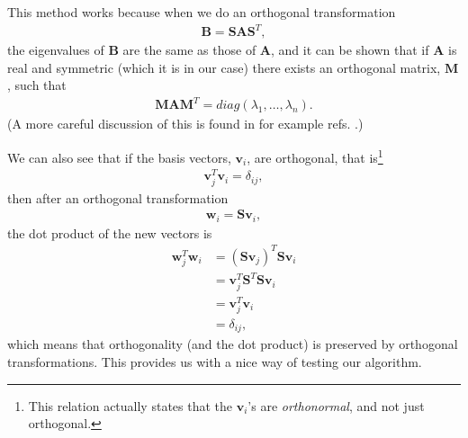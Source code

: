 \documentclass[12pt, a4paper]{article}
\begin{document}
This method works because when we do an orthogonal transformation 
\begin{align*}
\mathbf{B} = \mathbf{SAS}^T, 
\end{align*}
the eigenvalues of $\mathbf{B}$ are the same as those of $\mathbf{A}$, and
 it can be shown that \cite{Matrix Comp} if $\mathbf{A}$ is real and symmetric
(which it is in our case) there exists an orthogonal matrix, $\mathbf{M}$, such that 
\begin{align*}
\mathbf{MAM}^T = diag(\lambda_1,\dots,\lambda_n).  
\end{align*} 
(A more careful discussion of this is found in for example refs. \cite{Matrix Comp, Lecture Notes}.) 

We can also see that if the basis vectors, $\mathbf{v}_i$, are orthogonal, that is\footnote{This relation 
actually states that the $\mathbf{v}_i$'s are \textit{orthonormal}, and not just orthogonal.} 
\begin{align*}
\mathbf{v}_j^T\mathbf{v}_i = \delta_{ij}, 
\end{align*}
then after an orthogonal transformation 
\begin{align*}
\mathbf{w}_i = \mathbf{Sv}_i,  
\end{align*} 
the dot product of the new vectors is 
\begin{align*}
\mathbf{w}_j^T\mathbf{w}_i & = (\mathbf{Sv}_j)^T \mathbf{Sv}_i \\
						   & = \mathbf{v}_j^T\mathbf{S}^T \mathbf{Sv}_i \\ 
						   & = \mathbf{v}_j^T\mathbf{v}_i \\ 
						   & = \delta_{ij}, 
\end{align*}
which means that orthogonality (and the dot product) is preserved by orthogonal transformations. This 
provides us with a nice way of testing our algorithm. 
\end{document}
